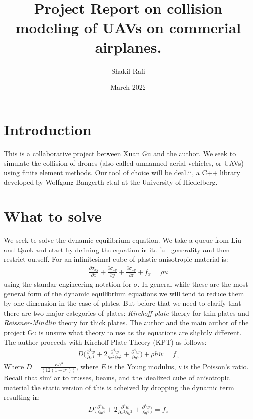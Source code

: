 \documentclass{article}
\title{Project Report on collision modeling of UAVs on commerial airplanes.}
\author{Shakil Rafi}
\date{March 2022}
\begin{document}
\maketitle

\section{Introduction}
This is a collaborative project between Xuan Gu and the author. We seek to simulate the collision of drones (also called unmanned aerial vehicles, or UAVs) using finite element methods. Our tool of choice will be deal.ii, a C++ library developed by Wolfgang Bangerth et.al at the University of Hiedelberg.

\section{What to solve}
We seek to solve the dynamic equilibrium equation. We take a queue from Liu and Quek and start by defining the equation in its full generality and then restrict ourself. For an infinitesimal cube of plastic anisotropic material is: 
\begin{align*}
    \frac{\partial \sigma_{xy}}{\partial x} + \frac{\partial \sigma_{xy}}{\partial y} + \frac{\partial \sigma_{xy}}{\partial z} + f_x = \rho \ddot{u}
\end{align*} 
using the standar engineering notation for $\sigma$. In general while these are the most general form of the dynamic equilibrium equations we will tend to reduce them by one dimension in the case of plates. But before that we need to clarify that there are two major categories of plates: \textit{Kirchoff plate} theory for thin plates and \textit{Reissner-Mindlin} theory for thick plates. The author and the main author of the project Gu is unsure what theory to use as the equations are slightly different. The author proceeds with Kirchoff Plate Theory (KPT) as follows:
\begin{align*}
    D\bigg(\frac{\partial^4 w}{\partial x^4} +2 \frac{\partial^4 w}{\partial x^2 \partial y^2}+\frac{\partial^4 w}{\partial y^4} \bigg) + \rho h \ddot{w} = f_z
\end{align*}
Where $D = \frac{Eh^3}{(12(1-\nu^2))}$, where $E$ is the Young modulus, $\nu$ is the Poisson's ratio. Recall that similar to trusses, beams, and the idealized cube of anisotropic material the static version of this is acheived by dropping the dynamic term resulting in:
\begin{align*}
    D\bigg(\frac{\partial^4 w}{\partial x^4} +2 \frac{\partial^4 w}{\partial x^2 \partial y^2}+\frac{\partial^4 w}{\partial y^4} \bigg) = f_z
\end{align*}
\end{document}
